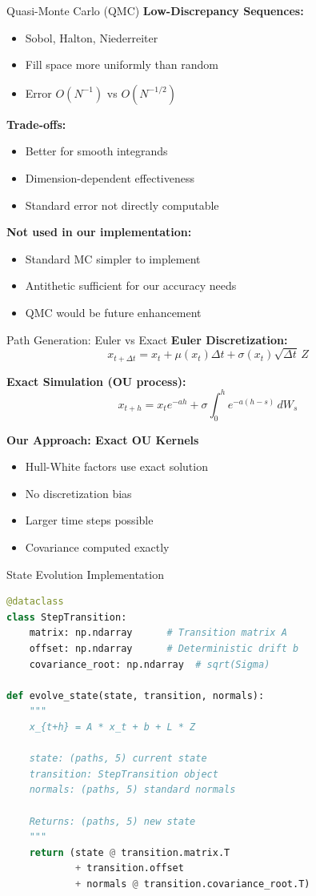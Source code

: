 \documentclass[aspectratio=169,11pt]{beamer}
\begin{document}
\begin{frame}{Quasi-Monte Carlo (QMC)}
\textbf{Low-Discrepancy Sequences:}
\begin{itemize}
    \item Sobol, Halton, Niederreiter
    \item Fill space more uniformly than random
    \item Error $O(N^{-1})$ vs $O(N^{-1/2})$
\end{itemize}

\textbf{Trade-offs:}
\begin{itemize}
    \item Better for smooth integrands
    \item Dimension-dependent effectiveness
    \item Standard error not directly computable
\end{itemize}

\textbf{Not used in our implementation:}
\begin{itemize}
    \item Standard MC simpler to implement
    \item Antithetic sufficient for our accuracy needs
    \item QMC would be future enhancement
\end{itemize}
\end{frame}

\begin{frame}{Path Generation: Euler vs Exact}
\textbf{Euler Discretization:}
\[
x_{t+\Delta t} = x_t + \mu(x_t)\Delta t + \sigma(x_t)\sqrt{\Delta t}\, Z
\]

\textbf{Exact Simulation (OU process):}
\[
x_{t+h} = x_t e^{-ah} + \sigma\int_0^h e^{-a(h-s)}\,dW_s
\]

\textbf{Our Approach: Exact OU Kernels}
\begin{itemize}
    \item Hull-White factors use exact solution
    \item No discretization bias
    \item Larger time steps possible
    \item Covariance computed exactly
\end{itemize}
\end{frame}

\begin{frame}[fragile]{State Evolution Implementation}
\begin{lstlisting}[language=Python]
@dataclass
class StepTransition:
    matrix: np.ndarray      # Transition matrix A
    offset: np.ndarray      # Deterministic drift b
    covariance_root: np.ndarray  # sqrt(Sigma)

def evolve_state(state, transition, normals):
    """
    x_{t+h} = A * x_t + b + L * Z

    state: (paths, 5) current state
    transition: StepTransition object
    normals: (paths, 5) standard normals

    Returns: (paths, 5) new state
    """
    return (state @ transition.matrix.T
            + transition.offset
            + normals @ transition.covariance_root.T)
\end{lstlisting}
\end{frame}
\end{document}
